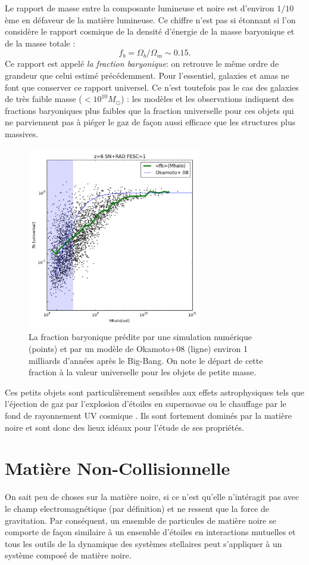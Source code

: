 Le rapport de masse entre la composante lumineuse et noire est d'environ $1/10$ème en défaveur de la matière lumineuse. Ce chiffre n'est pas si étonnant si l'on considère le rapport cosmique de la densité d'énergie de la masse baryonique et de la masse totale :
\begin{equation}
f_b=\Omega_b/\Omega_m\sim0.15.
\end{equation}
Ce rapport est appelé \textit{la fraction baryonique}: on retrouve le même ordre de grandeur que celui estimé précédemment. Pour l'essentiel, galaxies et amas ne font que conserver ce rapport universel. Ce n'est toutefois pas le cas des galaxies de très faible masse ($<10^{10} M_\odot$) : les modèles et les observations indiquent des fractions baryoniques plus faibles que la fraction universelle pour ces objets qui ne parviennent pas à piéger le gaz de façon aussi efficace que les structures plus massives. 
\begin{figure}[htbp]
	\centering
		\includegraphics[height=8cm]{figs/fbar.png}
	\caption{La fraction baryonique prédite par une simulation numérique (points) et par un modèle de Okamoto+08 (ligne) environ 1 milliards d'années après le Big-Bang. On note le départ de cette fraction à la valeur universelle pour les objets de petite masse.} 
	\label{f:fbar}
\end{figure}

Ces petits objets sont particulièrement sensibles aux effets astrophysiques tels que l'éjection de gaz par l'explosion d'étoiles en supernovae ou le chauffage par le fond de rayonnement UV cosmique . Ils sont fortement dominés par la matière noire et sont donc des lieux idéaux pour l'étude de ses propriétés.

\section{Matière Non-Collisionnelle}
On sait peu de choses sur la matière noire, si ce n'est qu'elle n'intéragit pas avec le champ electromagnétique (par définition) et ne ressent que la force de gravitation. Par conséquent, un ensemble de particules de matière noire se comporte de façon similaire à un ensemble d'étoiles en interactions mutuelles et tous les outils de la dynamique des systèmes stellaires peut s'appliquer à un système composé de matière noire.

